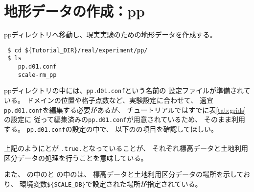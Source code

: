 \section{地形データの作成：pp} \label{sec:tutrial_real_pp}

ppディレクトリへ移動し、現実実験のための地形データを作成する。
\begin{verbatim}
 $ cd ${Tutorial_DIR}/real/experiment/pp/
 $ ls
    pp.d01.conf
    scale-rm_pp
\end{verbatim}
ppディレクトリの中には、\verb|pp.d01.conf|という名前の
設定ファイルが準備されている。
ドメインの位置や格子点数など、実験設定に合わせて、
適宜\verb|pp.d01.conf|を編集する必要があるが、
チュートリアルではすでに表\ref{tab:grids}の設定に
従って編集済みの\verb|pp.d01.conf|が用意されているため、
そのまま利用する。
\verb|pp.d01.conf|の設定の中で、
以下のの項目を確認してほしい。\\

\\

\noindent 上記のようにとが
\verb|.true.|となっていることが、
それぞれ標高データと土地利用区分データの処理を行うことを意味している。

また、
の中のと
の中のは、
標高データと土地利用区分データの場所を示しており、
環境変数\verb|${SCALE_DB}|で設定された場所が指定されている。\\

\\


